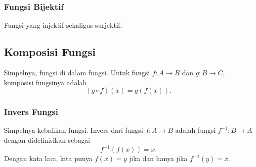 \subsubsection{Fungsi Bijektif}
Fungsi yang injektif sekaligus surjektif.

\subsection{Komposisi Fungsi}
Simpelnya, fungsi di dalam fungsi. Untuk fungsi $f:A \rightarrow B$ dan $g:B \rightarrow C$, komposisi fungsinya adalah
$$(g \circ f)(x) = g(f(x)).$$

\subsubsection{Invers Fungsi}
Simpelnya kebalikan fungsi. Invers dari fungsi $f: A \rightarrow B$ adalah fungsi $f^{-1} : B \rightarrow A$ dengan didefinisikan sebagai
$$f^{-1}(f(x))=x.$$
Dengan kata lain, kita punya $f(x)=y$ jika dan hanya jika $f^{-1}(y)=x$.

